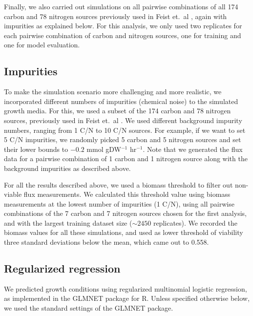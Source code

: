 \documentclass[12pt]{article}
\begin{document}
Finally, we also carried out simulations on all pairwise combinations of all 174 carbon and 78 nitrogen sources previously used in Feist et.\ al \cite{Feistetal2007}, again with impurities as explained below. For this analysis, we only used two replicates for each pairwise combination of carbon and nitrogen sources, one for training and one for model evaluation.

\subsection*{Impurities}
To make the simulation scenario more challenging and more realistic, we incorporated different numbers of impurities (chemical noise) to the simulated growth media. For this, we used a subset of the 174 carbon and 78 nitrogen sources, previously used in Feist et.\ al \cite{Feistetal2007}.  We used different background impurity numbers, ranging from 1 C/N to 10 C/N sources. For example, if we want to set 5 C/N impurities, we randomly picked 5 carbon and 5 nitrogen sources and set their lower bounds to $-0.2$ mmol gDW$^{-1}$ hr$^{-1}$. Note that we generated the flux data for a pairwise combination of 1 carbon and 1 nitrogen source along with the background impurities as described above. 

For all the results described above, we used a biomass threshold to filter out non-viable flux measurements. We calculated this threshold value using biomass measurements at the lowest number of impurities (1 C/N), using all pairwise combinations of the 7 carbon and 7 nitrogen sources chosen for the first analysis, and with the largest training dataset size ($\sim2450$ replicates). We recorded the biomass values for all these simulations, and used as lower threshold of viability three standard deviations below the mean, which came out to 0.558.

\subsection*{Regularized regression}

We predicted growth conditions using regularized multinomial logistic regression, as implemented in the GLMNET package \cite{Friedmanetal2010} for R. Unless specified otherwise below, we used the standard settings of the GLMNET package.
\end{document}
